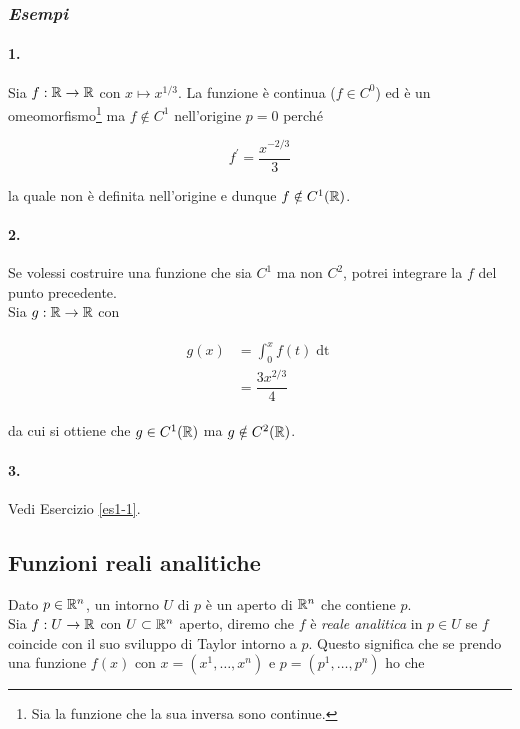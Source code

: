 \subsubsection{\textit{Esempi}}

\paragraph{1.}

Sia $ f : \mathbb{R} \to \mathbb{R} $ con $ x \mapsto x^{1/3} $. La funzione è continua ($ f \in C^{0} $) ed è un omeomorfismo\footnote{%
	Sia la funzione che la sua inversa sono continue.%
} ma $ f \notin C^{1} $ nell'origine $ p = 0 $ perché

\begin{equation}
	f^{\prime} = \dfrac{x^{-2/3}}{3}
\end{equation}

la quale non è definita nell'origine e dunque $ f \notin C^{1} (\mathbb{R}) $.

\paragraph{2.}

Se volessi costruire una funzione che sia $ C^{1} $ ma non $ C^{2} $, potrei integrare la $ f $ del punto precedente.\\
Sia $ g : \mathbb{R} \to \mathbb{R} $ con

\begin{align}
	\begin{split}
		g (x) &= \int_{0}^{x} f (t) \operatorname{dt}\\
		&= \dfrac{3 x^{2/3}}{4}
	\end{split} 
\end{align}

da cui si ottiene che $ g \in C^{1} (\mathbb{R}) $ ma $ g \notin C^{2} (\mathbb{R}) $.

\paragraph{3.}

Vedi Esercizio \ref{es1-1}.

\subsection{Funzioni reali analitiche}

Dato $ p \in \mathbb{R}^{n} $, un intorno $ U $ di $ p $ è un aperto di $ \mathbb{R}^{n} $ che contiene $ p $.\\
Sia $ f : U \to \mathbb{R} $ con $ U \subset \mathbb{R}^{n} $ aperto, diremo che $ f $ è \textit{reale analitica} in $ p \in U $ se $ f $ coincide con il suo sviluppo di Taylor intorno a $ p $. Questo significa che se prendo una funzione $ f (x) $ con $ x = (x^{1}, \dots, x^{n}) $ e $ p = (p^{1}, \dots, p^{n}) $ ho che

